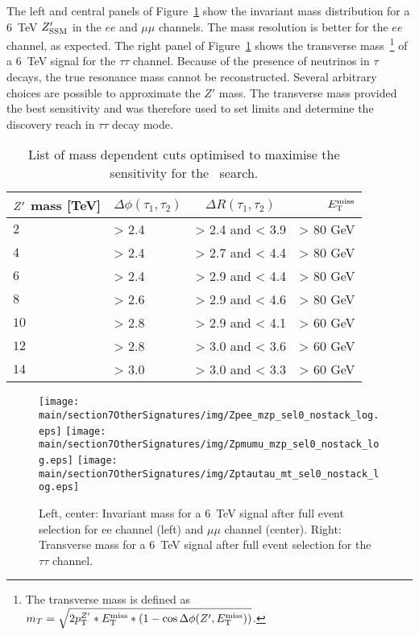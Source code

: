 The left and central panels of Figure~\ref{fig:leptonicresonances:masses} show the invariant mass distribution for a 6~TeV $Z^{\prime}_{\mathrm{SSM}}$ in the $ee$ and $\mu\mu$ channels. The mass resolution is better for the $ee$ channel, as expected. The right panel of Figure~\ref{fig:leptonicresonances:masses} shows the transverse mass~\footnote{The transverse mass is defined as $m_{T}  =  \sqrt{2p_{\text{T}}^{Z^{\prime}}*E_{\mathrm{T}}^{\mathrm{miss}}*(1-\cos\Delta\phi(Z^{\prime},E_{\mathrm{T}}^{\mathrm{miss}}))}$.}
of a 6~TeV signal for the $\tau\tau$ channel. Because of the presence of neutrinos in $\tau$ decays, the true resonance mass cannot be reconstructed. Several arbitrary  choices are possible to approximate the $Z'$ mass. The transverse mass provided the best sensitivity and was therefore used to set limits and determine the discovery reach in $\tau\tau$ decay mode.

\begin{table}[htbp]
   \centering
\begin{tabular}{l|l|c|r}
   $Z^{\prime}$ mass [TeV] &  $\Delta \phi(\tau_1, \tau_2)$&  $\Delta R(\tau_1, \tau_2)$ & $E_{\mathrm{T}}^{\mathrm{miss}}$\\
  \hline
   $2$ & > 2.4 & > 2.4 and < 3.9 & > 80 GeV\\
   $4$ & > 2.4 & > 2.7 and < 4.4 & > 80 GeV\\
   $6$ & > 2.4 & > 2.9 and < 4.4 & > 80 GeV\\
   $8$ & > 2.6 & > 2.9 and < 4.6 & > 80 GeV\\
  $10$ & > 2.8 & > 2.9 and < 4.1 & > 60 GeV\\
  $12$ & > 2.8 & > 3.0 and < 3.6 & > 60 GeV\\
  $14$ & > 3.0 & > 3.0 and < 3.3 & > 60 GeV\\
  \end{tabular}
  \caption{List of mass dependent cuts optimised to maximise the sensitivity for the \Zptata\ search.}
  \label{tab:leptonicresonances:selectiontautau}
\end{table}


\begin{figure}[htbp]
  \centering
  \texttt{[image: \\main/section7OtherSignatures/img/Zpee\_mzp\_sel0\_nostack\_log.eps]}
  \texttt{[image: \\main/section7OtherSignatures/img/Zpmumu\_mzp\_sel0\_nostack\_log.eps]}
  \texttt{[image: \\main/section7OtherSignatures/img/Zptautau\_mt\_sel0\_nostack\_log.eps]}
  \caption{Left, center: Invariant mass for a 6~TeV signal after full event selection for ee channel (left) and $\mu\mu$ channel (center). Right: Transverse mass for a 6~TeV signal after full event selection for the $\tau\tau$ channel. }
  \label{fig:leptonicresonances:masses}
\end{figure}

